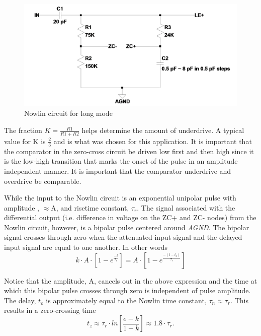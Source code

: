 \documentclass[12pt,oneside,final]{siuethesis}
\theoremstyle{definition}
\begin{document}
\begin{figure}[htbp!]
\centering
\includegraphics[scale=.27,keepaspectratio=true]{../LTspice_Drawings/nowlin/nowlin_long.png} 
\caption{Nowlin circuit for long mode}
\label{fig:Nowlinlong}
\end{figure}

\par The fraction $K = \frac{R1}{R1 + R2}$ helps determine the amount of underdrive. A typical value for K is $\frac{2}{3}$ and is what was chosen for this application. It is important that the comparator in the zero-cross circuit be driven low first and then high since it is the low-high transition that marks the onset of the pulse in an amplitude independent manner. It is important that the comparator underdrive and overdrive be comparable.
\par While the input to the Nowlin circuit is an exponential unipolar pulse with amplitude , $\approx$A, and risetime constant, $\tau_{r}$. The signal associated with the differential output (i.e. difference in voltage on the ZC+ and ZC- nodes) from the Nowlin circuit, however, is a bipolar pulse centered around \emph{AGND}. The bipolar signal crosses through
zero when the attenuated input signal and the delayed input signal are equal to one another. In other words
\begin{equation}
k \cdot A \cdot \left[ 1 - e^{\frac{-t}{\tau_r}} \right] = A \cdot \left[ 1 - e^{\frac{-(t - t_o)}{\tau_r}} \right]
\end{equation}

Notice that the amplitude, A, cancels out in the above expression and the time at which this bipolar pulse crosses through zero is independent of pulse amplitude. The delay, $t_{o}$ is approximately equal to the Nowlin time constant, $\tau_{n} \approx \tau_{r}$. This results in a zero-crossing time
\begin{equation}
t_z \approx \tau_r \cdot ln \left[ \frac{e - k}{1-k}\right] \approx 1.8 \cdot \tau_r.
\end{equation}
\end{document}
